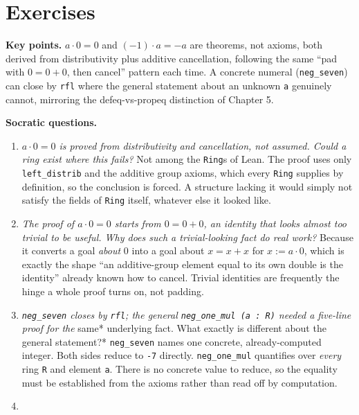 \section{Exercises}\label{sec:09-ring-theorems:04-exercises:1}

\textbf{Key points.} \(a\cdot 0=0\) and \((-1)\cdot a=-a\) are theorems, not axioms, both derived from distributivity plus additive cancellation, following the same ``pad with \(0=0+0\), then cancel'' pattern each time. A concrete numeral (\texttt{neg\_\allowbreak{}seven}) can close by \texttt{rfl} where the general statement about an unknown \texttt{a} genuinely cannot, mirroring the defeq-vs-propeq distinction of Chapter 5.

\textbf{Socratic questions.}

\begin{enumerate}
\def\labelenumi{\arabic{enumi}.}
\item
  \emph{\(a \cdot 0 = 0\) is proved from distributivity and cancellation, not assumed. Could a ring exist where this fails?} Not among the \texttt{Ring}s of Lean. The proof uses only \texttt{left\_\allowbreak{}distrib} and the additive group axioms, which every \texttt{Ring} supplies by definition, so the conclusion is forced. A structure lacking it would simply not satisfy the fields of \texttt{Ring} itself, whatever else it looked like.
\item
  \emph{The proof of \(a \cdot 0 = 0\) starts from \(0 = 0 + 0\), an identity that looks almost too trivial to be useful. Why does such a trivial-looking fact do real work?} Because it converts a goal \emph{about} \(0\) into a goal about \(x = x + x\) for \(x := a \cdot 0\), which is exactly the shape ``an additive-group element equal to its own double is the identity'' already known how to cancel. Trivial identities are frequently the hinge a whole proof turns on, not padding.
\item
  \emph{\texttt{neg\_\allowbreak{}seven} closes by \texttt{rfl}; the general \texttt{neg\_\allowbreak{}one\_\allowbreak{}mul (a : R)} needed a five-line proof for the }same* underlying fact. What exactly is different about the general statement?* \texttt{neg\_\allowbreak{}seven} names one concrete, already-computed integer. Both sides reduce to \texttt{-\allowbreak{}7} directly. \texttt{neg\_\allowbreak{}one\_\allowbreak{}mul} quantifies over \emph{every} ring \texttt{R} and element \texttt{a}. There is no concrete value to reduce, so the equality must be established from the axioms rather than read off by computation.
\item

\end{enumerate}
